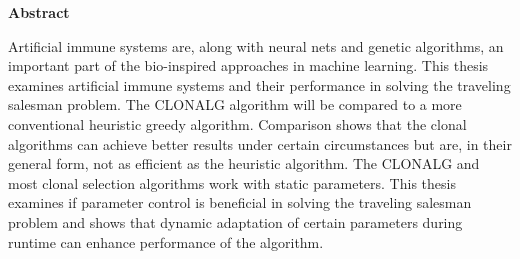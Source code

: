 %
%
% 
% 
% 



\cleardoublepage


\begin{center}
{\Large\bfseries Abstract}
\end{center}
Artificial immune systems are, along with neural nets and genetic algorithms, an important part of the bio-inspired approaches in machine learning. This thesis examines artificial immune systems and their performance in solving the traveling salesman problem. The CLONALG algorithm will be compared to a more conventional heuristic greedy algorithm. Comparison shows that the clonal algorithms can achieve better results under certain circumstances but are, in their general form, not as efficient as the heuristic algorithm. The CLONALG and most clonal selection algorithms work with static parameters. This thesis examines if parameter control is beneficial in solving the traveling salesman problem and shows that dynamic adaptation of certain parameters during runtime can enhance performance of the algorithm. 

